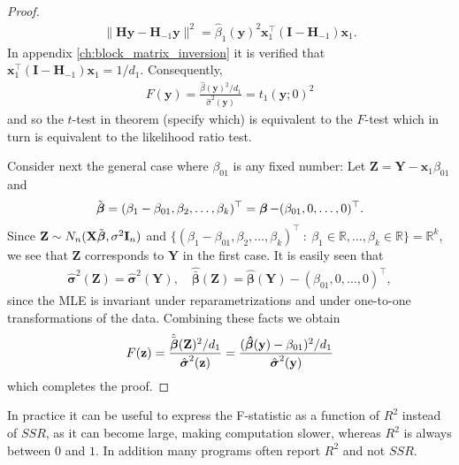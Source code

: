 \begin{proof}
\begin{align*}
        \|\textbf{H}\textbf{y} - \textbf{H}_{-1}\textbf{y}\|^2 = \hat{\beta}_1(\textbf{y})^2\textbf{x}_1^\top(\textbf{I} - \textbf{H}_{-1})\textbf{x}_1.
    \end{align*}
    In appendix \ref{ch:block_matrix_inversion} it is verified that $\textbf{x}_1^\top(\textbf{I} - \textbf{H}_{-1})\textbf{x}_1 = 1/d_1$.
    Consequently,
    \begin{align*}
        F(\textbf{y}) = \frac{\hat{\beta}(\textbf{y})^2/d_1}{\hat{\sigma}^2(\textbf{y})} = t_1(\textbf{y};0)^2
    \end{align*}
    and so the $t$-test in theorem (specify which) is equivalent to the $F$-test which in turn is equivalent to the likelihood ratio test.
    
    Consider next the general case where $\beta_{01}$ is any fixed number: Let $\textbf{Z} = \textbf{Y} - \textbf{x}_1\beta_{01}$ and
    \begin{align*}
        \Tilde{\operatorname{\boldsymbol{\beta}}} = (\beta_1 - \beta_{01}, \beta_2, \ldots, \beta_k)^\top = \operatorname{\boldsymbol{\beta}} - (\beta_{01}, 0, \ldots, 0)^\top.
    \end{align*}
    Since $\textbf{Z} \sim N_n(\textbf{X}\Tilde{\boldsymbol{\beta}}, \sigma^2\textbf{I}_n)$ and $\{ (\beta_1 - \beta_{01}, \beta_2, \ldots, \beta_k)^\top \ : \ \beta_1 \in \mathbb{R}, \ldots, \beta_k \in \mathbb{R} \} = \mathbb{R}^k$, we see that $\textbf{Z}$ corresponds to $\textbf{Y}$ in the first case.
    It is easily seen that
    \begin{align*}
        \hat{\boldsymbol{\sigma}}^2(\textbf{Z}) = \hat{\boldsymbol{\sigma}}^2(\textbf{Y}), \quad \hat{\bar{\boldsymbol{\beta}}}(\textbf{Z}) = \hat{\boldsymbol{\beta}}(\textbf{Y}) - (\beta_{01}, 0, \ldots, 0)^\top,
    \end{align*}
    since the MLE is invariant under reparametrizations and under one-to-one transformations of the data.
    Combining these facts we obtain
    \begin{align*}
        F(\textbf{z}) =
        \frac{\hat{\bar{\boldsymbol{\beta}}}(\textbf{Z})^2/d_1}{\hat{\boldsymbol{\sigma}}^2(\textbf{z})} = 
        \frac{(\operatorname{\boldsymbol{\hat{\beta}}}(\textbf{y}) - \beta_{01})^2/d_1}{\hat{\boldsymbol{\sigma}}^2(\textbf{y})}
    \end{align*}
    which completes the proof.
\end{proof}

In practice it can be useful to express the F-statistic as a function of $R^2$ instead of $SSR$, as it can become large, making computation slower, whereas $R^2$ is always between $0$ and $1$. In addition many programs often report $R^2$ and not $SSR$.

